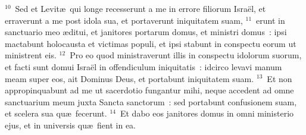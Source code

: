 ${}^{10}$~Sed et Levit\ae\ qui longe recesserunt a me in errore filiorum Isra\"el, et erraverunt a me post idola sua, et portaverunt iniquitatem suam,
${}^{11}$~erunt in sanctuario meo \ae ditui, et janitores portarum domus, et ministri domus~: ipsi mactabunt holocausta et victimas populi, et ipsi stabunt in conspectu eorum ut ministrent eis.
${}^{12}$~Pro eo quod ministraverunt illis in conspectu idolorum suorum, et facti sunt domui Isra\"el in offendiculum iniquitatis~: idcirco levavi manum meam super eos, ait Dominus Deus, et portabunt iniquitatem suam.
${}^{13}$~Et non appropinquabunt ad me ut sacerdotio fungantur mihi, neque accedent ad omne sanctuarium meum juxta Sancta sanctorum~: sed portabunt confusionem suam, et scelera sua qu\ae\ fecerunt.
${}^{14}$~Et dabo eos janitores domus in omni ministerio ejus, et in universis qu\ae\ fient in ea.


